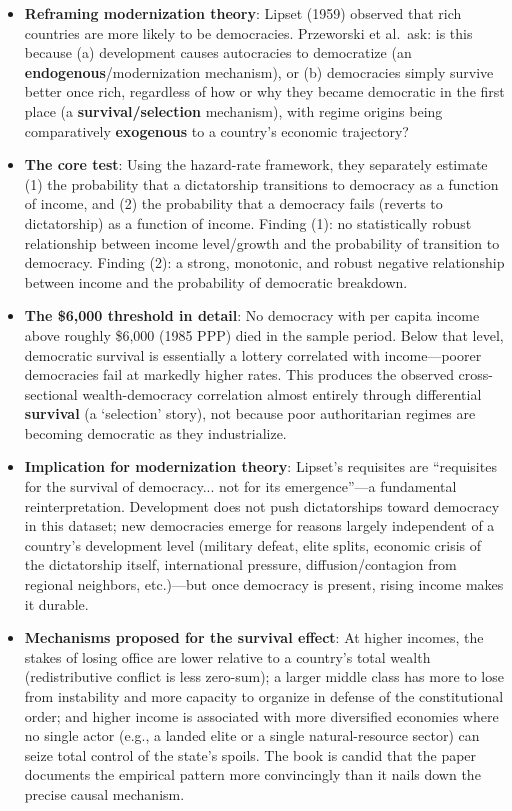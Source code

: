 \documentclass[12pt]{article}
\begin{document}
\begin{itemize}[leftmargin=*, itemsep=4pt]
    \item \textbf{Reframing modernization theory}: Lipset (1959) observed that rich countries are more likely to be democracies. Przeworski et al.\ ask: is this because (a) development causes autocracies to democratize (an \textbf{endogenous}/modernization mechanism), or (b) democracies simply survive better once rich, regardless of how or why they became democratic in the first place (a \textbf{survival/selection} mechanism), with regime origins being comparatively \textbf{exogenous} to a country's economic trajectory?
    \item \textbf{The core test}: Using the hazard-rate framework, they separately estimate (1) the probability that a dictatorship transitions to democracy as a function of income, and (2) the probability that a democracy fails (reverts to dictatorship) as a function of income. Finding (1): no statistically robust relationship between income level/growth and the probability of transition to democracy. Finding (2): a strong, monotonic, and robust negative relationship between income and the probability of democratic breakdown.
    \item \textbf{The \$6,000 threshold in detail}: No democracy with per capita income above roughly \$6,000 (1985 PPP) died in the sample period. Below that level, democratic survival is essentially a lottery correlated with income---poorer democracies fail at markedly higher rates. This produces the observed cross-sectional wealth-democracy correlation almost entirely through differential \textbf{survival} (a `selection' story), not because poor authoritarian regimes are becoming democratic as they industrialize.
    \item \textbf{Implication for modernization theory}: Lipset's requisites are ``requisites for the survival of democracy... not for its emergence''---a fundamental reinterpretation. Development does not push dictatorships toward democracy in this dataset; new democracies emerge for reasons largely independent of a country's development level (military defeat, elite splits, economic crisis of the dictatorship itself, international pressure, diffusion/contagion from regional neighbors, etc.)---but once democracy is present, rising income makes it durable.
    \item \textbf{Mechanisms proposed for the survival effect}: At higher incomes, the stakes of losing office are lower relative to a country's total wealth (redistributive conflict is less zero-sum); a larger middle class has more to lose from instability and more capacity to organize in defense of the constitutional order; and higher income is associated with more diversified economies where no single actor (e.g., a landed elite or a single natural-resource sector) can seize total control of the state's spoils. The book is candid that the paper documents the empirical pattern more convincingly than it nails down the precise causal mechanism.

\end{itemize}
\end{document}
